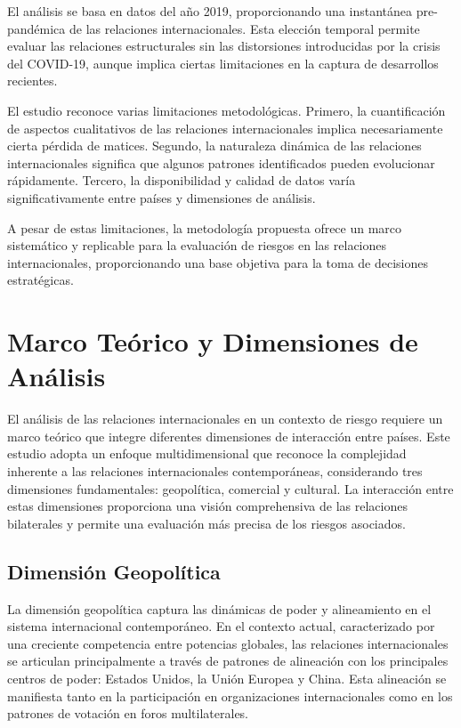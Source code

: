 \documentclass[11pt,a4paper]{article}
\begin{document}
El análisis se basa en datos del año 2019, proporcionando una instantánea pre-pandémica de las relaciones internacionales. Esta elección temporal permite evaluar las relaciones estructurales sin las distorsiones introducidas por la crisis del COVID-19, aunque implica ciertas limitaciones en la captura de desarrollos recientes.

El estudio reconoce varias limitaciones metodológicas. Primero, la cuantificación de aspectos cualitativos de las relaciones internacionales implica necesariamente cierta pérdida de matices. Segundo, la naturaleza dinámica de las relaciones internacionales significa que algunos patrones identificados pueden evolucionar rápidamente. Tercero, la disponibilidad y calidad de datos varía significativamente entre países y dimensiones de análisis.

A pesar de estas limitaciones, la metodología propuesta ofrece un marco sistemático y replicable para la evaluación de riesgos en las relaciones internacionales, proporcionando una base objetiva para la toma de decisiones estratégicas.

\section{Marco Teórico y Dimensiones de Análisis}

El análisis de las relaciones internacionales en un contexto de riesgo requiere un marco teórico que integre diferentes dimensiones de interacción entre países. Este estudio adopta un enfoque multidimensional que reconoce la complejidad inherente a las relaciones internacionales contemporáneas, considerando tres dimensiones fundamentales: geopolítica, comercial y cultural. La interacción entre estas dimensiones proporciona una visión comprehensiva de las relaciones bilaterales y permite una evaluación más precisa de los riesgos asociados.

\subsection{Dimensión Geopolítica}

La dimensión geopolítica captura las dinámicas de poder y alineamiento en el sistema internacional contemporáneo. En el contexto actual, caracterizado por una creciente competencia entre potencias globales, las relaciones internacionales se articulan principalmente a través de patrones de alineación con los principales centros de poder: Estados Unidos, la Unión Europea y China. Esta alineación se manifiesta tanto en la participación en organizaciones internacionales como en los patrones de votación en foros multilaterales.
\end{document}
